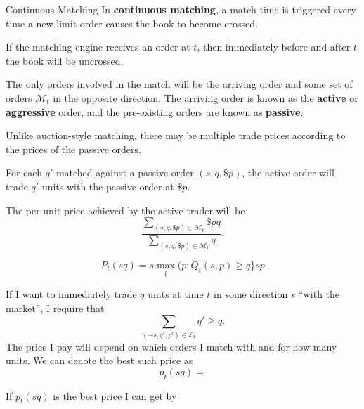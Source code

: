 \documentclass{beamer}
\begin{document}
\begin{frame}{Continuous Matching}
	In \textbf{continuous matching}, a match time is triggered every time a new limit order causes the book to become crossed.

	If the matching engine receives an order at $t$, then immediately before and after $t$ the book will be uncrossed.

	The only orders involved in the match will be the arriving order and some set of orders $\mathcal{M}_t$ in the opposite direction. The arriving order is known as the \textbf{active} or \textbf{aggressive} order, and the pre-existing orders are known as \textbf{passive}. %


	\pause

	Unlike auction-style matching, there may be multiple trade prices according to the prices of the passive orders.

	For each $q'$ matched against a passive order $(s,q,\$p)$, the active order will trade $q'$ units with the passive order at $\$p$. %

	The per-unit price achieved by the active trader will be
	$$\frac{\sum_{(s,q,\$p)\in\mathcal{M}_t} \$pq}{\sum_{(s,q,\$p)\in\mathcal{M}_t} q}.$$ %


	
	$$P_t(sq) = s\max_\{(p : Q_t(s,p)\geq q\} sp$$


	If I want to immediately trade $q$ units at time $t$ in some direction $s$ ``with the market'', I require that
	$$\sum_{(-s,q',p')\in\mathcal{L}_t}q' \geq q.$$
	The price I pay will depend on which orders I match with and for how many units. We can denote the best such price as
	$$p_t(sq) = $$

	If $p_t(sq)$ is the best price I can get by 


\end{frame}
\end{document}
